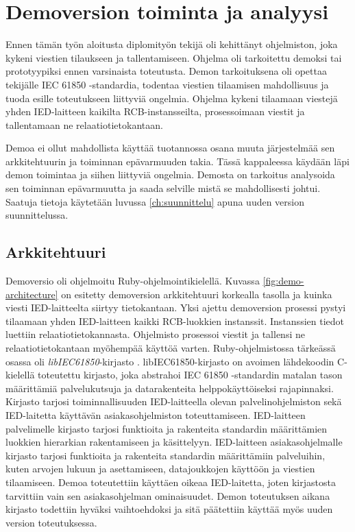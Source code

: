 \chapter{Demoversion toiminta ja analyysi}
\label{ch:demo-analysis}
Ennen tämän työn aloitusta diplomityön tekijä oli kehittänyt ohjelmiston, joka kykeni viestien tilaukseen ja tallentamiseen. Ohjelma oli tarkoitettu demoksi tai prototyypiksi ennen varsinaista toteutusta. Demon tarkoituksena oli opettaa tekijälle IEC 61850 -standardia, todentaa viestien tilaamisen mahdollisuus ja tuoda esille toteutukseen liittyviä ongelmia. Ohjelma kykeni tilaamaan viestejä yhden IED-laitteen kaikilta RCB-instansseilta, prosessoimaan viestit ja tallentamaan ne relaatiotietokantaan.

Demoa ei ollut mahdollista käyttää tuotannossa osana muuta järjestelmää sen arkkitehtuurin ja toiminnan epävarmuuden takia. Tässä kappaleessa käydään läpi demon toimintaa ja siihen liittyviä ongelmia. Demosta on tarkoitus analysoida sen toiminnan epävarmuutta ja saada selville mistä se mahdollisesti johtui. Saatuja tietoja käytetään luvussa \ref{ch:suunnittelu} apuna uuden version suunnittelussa.


\section{Arkkitehtuuri}
\label{ch:demoversio-ja-sen-toiminta}
Demoversio oli ohjelmoitu Ruby-ohjelmointikielellä. Kuvassa \ref{fig:demo-architecture} on esitetty demoversion arkkitehtuuri korkealla tasolla ja kuinka viesti IED-laitteelta siirtyy tietokantaan. Yksi ajettu demoversion prosessi pystyi tilaamaan yhden IED-laitteen kaikki RCB-luok\-ki\-en instanssit. Instanssien tiedot luettiin relaatiotietokannasta. Ohjelmisto prosessoi viestit ja tallensi ne relaatiotietokantaan myöhempää käyttöä varten. Ruby-ohjelmistossa tärkeässä osassa oli \emph{libIEC61850}-kirjasto \cite{libIEC61850-homepage}. libIEC61850-kirjasto on avoimen lähdekoodin C-kielellä toteutettu kirjasto, joka abstrahoi IEC 61850 -standardin matalan tason määrittämiä palvelukutsuja ja datarakenteita helppokäyttöiseksi rajapinnaksi. Kirjasto tarjosi toiminnallisuuden IED-laitteella olevan palvelinohjelmiston sekä IED-laitetta käyttävän asiakasohjelmiston toteuttamiseen. IED-laitteen palvelimelle kirjasto tarjosi funktioita ja rakenteita standardin määrittämien luokkien hierarkian rakentamiseen ja käsittelyyn. IED-laitteen asiakasohjelmalle kirjasto tarjosi funktioita ja rakenteita standardin määrittämiin palveluihin, kuten arvojen lukuun ja asettamiseen, datajoukkojen käyttöön ja viestien tilaamiseen. Demoa toteutettiin käyttäen oikeaa IED-laitetta, joten kirjastosta tarvittiin vain sen asiakasohjelman ominaisuudet. Demon toteutuksen aikana kirjasto todettiin hyväksi vaihtoehdoksi ja sitä päätettiin käyttää myös uuden version toteutuksessa.

